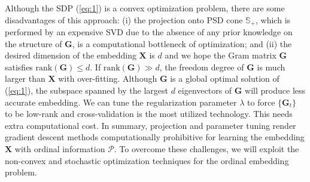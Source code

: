 \documentclass[letterpaper]{article} %
\begin{document}
Although the SDP (\ref{eq:1}) is a convex optimization problem, there are some disadvantages of this approach: (i) the projection onto PSD cone $\mathbb{S}_+$, which is performed by an expensive SVD due to the absence of any prior knowledge on the structure of $\mathbf{G}$, is a computational bottleneck of optimization; and (ii) the desired dimension of the embedding $\mathbf{X}$ is $d$ and we hope the Gram matrix $\mathbf{G}$ satisfies $\text{rank}(\mathbf{G})\leq d$. If $\text{rank}(\mathbf{G})\gg d$, the freedom degree of $\mathbf{G}$ is much larger than $\mathbf{X}$ with over-fitting. Although $\mathbf{G}$ is a global optimal solution of (\ref{eq:1}), the subspace spanned by the largest $d$ eigenvectors of $\mathbf{G}$ will produce less accurate embedding. We can tune the regularization parameter $\lambda$ to force $\{\mathbf{G}_t\}$ to be low-rank and cross-validation is the most utilized technology. This needs extra computational cost. In summary, projection and parameter tuning render gradient descent methods computationally prohibitive for learning the embedding $\mathbf{X}$ with ordinal information $\mathcal{P}$. To overcome these challenges, we will exploit the non-convex and stochastic optimization techniques for the ordinal embedding problem.
	
	
\end{document}
